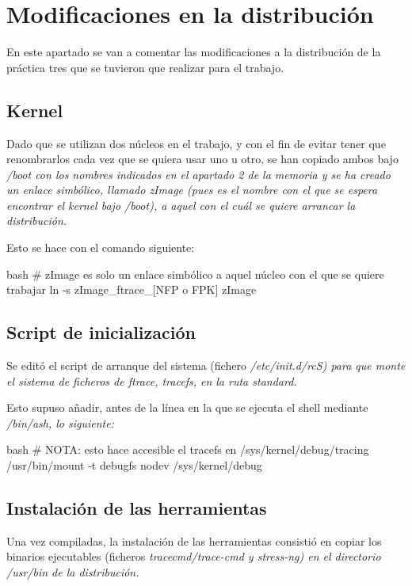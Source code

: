 \documentclass[../main.tex]{subfiles}
\begin{document}
\section{Modificaciones en la distribución}

En este apartado se van a comentar las modificaciones a la distribución de la práctica tres que se tuvieron que realizar para el trabajo.

\subsection{Kernel}

Dado que se utilizan dos núcleos en el trabajo, y con el fin de evitar tener que renombrarlos cada vez que se quiera usar uno u otro, se han copiado ambos bajo \it{/boot} con los nombres indicados en el apartado 2 de la memoria y se ha creado un enlace simbólico, llamado \it{zImage} (pues es el nombre con el que se espera encontrar el kernel bajo \it{/boot}), a aquel con el cuál se quiere arrancar la distribución.

Esto se hace con el comando siguiente:
\begin{codigo}{bash}
# zImage es solo un enlace simbólico a aquel núcleo con el que se quiere trabajar
ln -s zImage_ftrace_[NFP o FPK] zImage
\end{codigo}

\subsection{Script de inicialización}

Se editó el script de arranque del sistema (fichero \it{/etc/init.d/rcS}) para que monte el sistema de ficheros de ftrace, \it{tracefs}, en la ruta standard.

Esto supuso añadir, antes de la línea en la que se ejecuta el shell mediante \it{/bin/ash}, lo siguiente:
\begin{codigo}{bash}
# NOTA: esto hace accesible el tracefs en /sys/kernel/debug/tracing
/usr/bin/mount -t debugfs nodev /sys/kernel/debug
\end{codigo}

\subsection{Instalación de las herramientas}

Una vez compiladas, la instalación de las herramientas consistió en copiar los binarios ejecutables (ficheros \it{tracecmd/trace-cmd} y \it{stress-ng}) en el directorio \it{/usr/bin} de la distribución.
\end{document}
